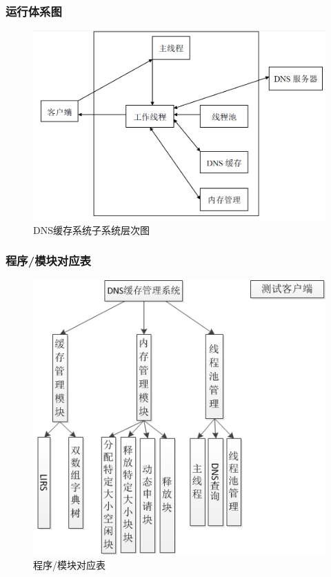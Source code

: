 \documentclass[12pt, a4paper, titlepage]{article}
\begin{document}
\subsubsection{运行体系图}
\begin{figure}[H]
\centering
\includegraphics[keepaspectratio, scale=0.5]{pitures/xitongyunxing.png}
\caption{DNS缓存系统子系统层次图}
\end{figure}
\subsubsection{程序/模块对应表}
\begin{figure}[H]
\centering
\includegraphics[keepaspectratio, scale=1]{pitures/struct.png}
\caption{程序/模块对应表}
\end{figure}
\end{document}
